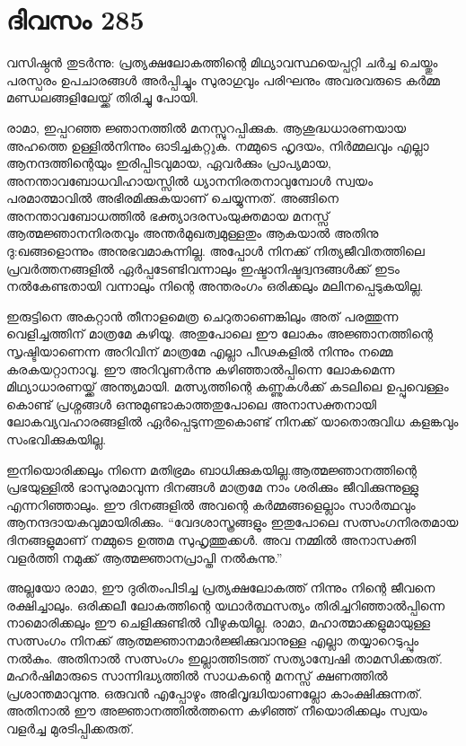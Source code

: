 \section{ദിവസം 285}


വസിഷ്ഠന്‍ തുടര്‍ന്നു: പ്രത്യക്ഷലോകത്തിന്റെ മിഥ്യാവസ്ഥയെപ്പറ്റി ചര്‍ച്ച ചെയ്തും പരസ്പരം ഉപചാരങ്ങള്‍ അര്‍പ്പിച്ചും സുരാഗുവും പരിഘനും അവരവരുടെ കര്‍മ്മ മണ്ഡലങ്ങളിലേയ്ക്ക് തിരിച്ചു പോയി. 

രാമാ, ഇപ്പറഞ്ഞ ജ്ഞാനത്തില്‍ മനസ്സുറപ്പിക്കുക. ആശുദ്ധധാരണയായ അഹത്തെ ഉള്ളില്‍നിന്നും ഓടിച്ചകറ്റുക. നമ്മുടെ ഹൃദയം, നിര്‍മ്മലവും എല്ലാ ആനന്ദത്തിന്റെയും ഇരിപ്പിടവുമായ, ഏവര്‍ക്കും പ്രാപ്യമായ, അനന്താവബോധവിഹായസ്സില്‍ ധ്യാനനിരതനാവുമ്പോള്‍ സ്വയം പരമാത്മാവില്‍ അഭിരമിക്കുകയാണ് ചെയ്യുന്നത്. അങ്ങിനെ അനന്താവബോധത്തില്‍ ഭക്ത്യാദരസംയുക്തമായ മനസ്സ് ആത്മജ്ഞാനനിരതവും അന്തര്‍മുഖത്വമുള്ളതും ആകയാല്‍ അതിനു ദു:ഖങ്ങളൊന്നും അനുഭവമാകുന്നില്ല. അപ്പോള്‍ നിനക്ക് നിത്യജീവിതത്തിലെ പ്രവര്‍ത്തനങ്ങളില്‍ ഏര്‍പ്പടേണ്ടിവന്നാലും ഇഷ്ടാനിഷ്ടദ്വന്ദങ്ങള്‍ക്ക് ഇടം നല്‍കേണ്ടതായി വന്നാലും നിന്റെ അന്തരംഗം ഒരിക്കലും മലിനപ്പെടുകയില്ല.        

ഇരുട്ടിനെ അകറ്റാന്‍ തീനാളമെത്ര ചെറുതാണെങ്കിലും അത് പരത്തുന്ന വെളിച്ചത്തിന് മാത്രമേ കഴിയൂ. അതുപോലെ ഈ ലോകം അജ്ഞാനത്തിന്റെ സൃഷ്ടിയാണെന്ന അറിവിന്‌ മാത്രമേ എല്ലാ പീഢകളില്‍ നിന്നും നമ്മെ കരകയറ്റാനാവൂ. ഈ അറിവുണര്‍ന്നു കഴിഞ്ഞാല്‍പ്പിന്നെ ലോകമെന്ന മിഥ്യാധാരണയ്ക്ക് അന്ത്യമായി. മത്സ്യത്തിന്റെ കണ്ണുകള്‍ക്ക് കടലിലെ ഉപ്പുവെള്ളം കൊണ്ട് പ്രശ്നങ്ങള്‍ ഒന്നുമുണ്ടാകാത്തതുപോലെ അനാസക്തനായി ലോകവ്യവഹാരങ്ങളില്‍ ഏര്‍പ്പെടുന്നതുകൊണ്ട് നിനക്ക് യാതൊരുവിധ കളങ്കവും സംഭവിക്കുകയില്ല. 

ഇനിയൊരിക്കലും നിന്നെ മതിഭ്രമം ബാധിക്കുകയില്ല.ആത്മജ്ഞാനത്തിന്റെ പ്രഭയുള്ളില്‍ ഭാസുരമാവുന്ന ദിനങ്ങള്‍ മാത്രമേ നാം ശരിക്കും ജീവിക്കുന്നുള്ളു എന്നറിഞ്ഞാലും. ഈ ദിനങ്ങളില്‍ അവന്റെ കര്‍മ്മങ്ങളെല്ലാം സാര്‍ത്ഥവും  ആനന്ദദായകവുമായിരിക്കും. “വേദശാസ്ത്രങ്ങളും ഇതുപോലെ സത്സംഗനിരതമായ ദിനങ്ങളുമാണ് നമ്മുടെ ഉത്തമ സുഹൃത്തുക്കള്‍.  അവ നമ്മില്‍ അനാസക്തി വളര്‍ത്തി നമുക്ക് ആത്മജ്ഞാനപ്രാപ്തി നല്‍കുന്നു.”

അല്ലയോ രാമാ, ഈ ദുരിതംപിടിച്ച പ്രത്യക്ഷലോകത്ത് നിന്നും നിന്റെ ജീവനെ രക്ഷിച്ചാലും. ഒരിക്കലീ ലോകത്തിന്റെ യഥാര്‍ത്ഥസത്യം തിരിച്ചറിഞ്ഞാല്‍പ്പിന്നെ നാമൊരിക്കലും ഈ ചെളിക്കുണ്ടില്‍ വീഴുകയില്ല. രാമാ, മഹാത്മാക്കളുമായുള്ള സത്സംഗം നിനക്ക് ആത്മജ്ഞാനമാര്‍ജ്ജിക്കുവാനുള്ള എല്ലാ തയ്യാറെടുപ്പും നല്‍കും. അതിനാല്‍ സത്സംഗം ഇല്ലാത്തിടത്ത് സത്യാന്വേഷി താമസിക്കരുത്. മഹര്‍ഷിമാരുടെ സാന്നിദ്ധ്യത്തില്‍ സാധകന്റെ മനസ്സ് ക്ഷണത്തില്‍ പ്രശാന്തമാവുന്നു. ഒരുവന്‍ എപ്പോഴും അഭിവൃദ്ധിയാണല്ലോ കാംക്ഷിക്കുന്നത്. അതിനാല്‍ ഈ അജ്ഞാനത്തില്‍ത്തന്നെ കഴിഞ്ഞ് നീയൊരിക്കലും സ്വയം വളര്‍ച്ച മുരടിപ്പിക്കരുത്. 
 
